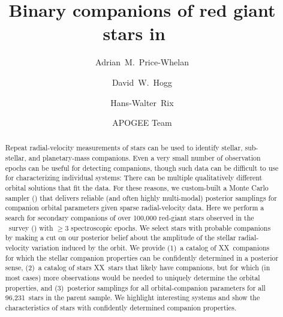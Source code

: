 \documentclass[modern, letterpaper]{aastex62}
\newcommand{\apogee}{\project{\acronym{APOGEE}}}
\newcommand{\thejoker}{\project{The~Joker}}
\newcommand{\DR}{\acronym{DR14}}
\newcommand{\nstars}{96,231}
\newcommand{\nunimodal}{XX}
\newcommand{\nmultimodal}{XX}
\begin{document}
\sloppy\sloppypar\raggedbottom\frenchspacing %

\title{Binary companions of red giant stars in \apogee\ \DR}

\author[0000-0003-0872-7098]{Adrian~M.~Price-Whelan}

\author[0000-0003-2866-9403]{David~W.~Hogg}

\author[0000-0003-4996-9069]{Hans-Walter~Rix}

\author{APOGEE Team}

\begin{abstract}\noindent %
Repeat radial-velocity measurements of stars can be used to identify stellar,
sub-stellar, and planetary-mass companions.
Even a very small number of observation epochs can be useful for detecting companions,
though such data can be difficult to use for characterizing
individual systems:
There can be multiple qualitatively different orbital solutions that fit the data.
For these reasons, we custom-built a Monte Carlo sampler (\thejoker)
that delivers reliable (and often highly
multi-modal) posterior samplings for companion orbital parameters given sparse
radial-velocity data.
Here we
perform a search for secondary companions of over 100,000 red-giant
stars observed in the
\apogee\ survey (\DR) with $\geq 3$ spectroscopic epochs.
We select stars with probable companions by making a cut on our posterior belief
about the amplitude of the stellar radial-velocity variation induced by the
orbit.
We provide (1)~a catalog of \nunimodal\ companions for which the stellar
companion properties can be confidently determined in a posterior sense, (2)~a
catalog of stars \nmultimodal\ stars that likely have companions, but for which
(in most cases) more observations would be needed to uniquely determine the
orbital properties, and (3)~posterior samplings for all orbital-companion
parameters for all \nstars\ stars in the parent sample.
We highlight interesting systems and show the characteristics of stars with
confidently determined companion properties.
\end{abstract}
\end{document}
